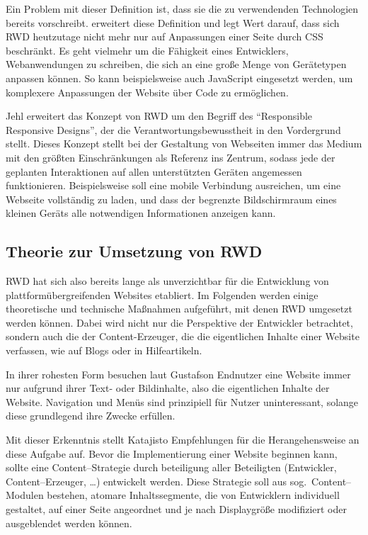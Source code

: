 Ein Problem mit dieser Definition ist, dass sie die zu verwendenden Technologien bereits vorschreibt.
\autocite[S. 28]{Laati.ImplementingResponsiveDesignInIndustrialDashboardEditor.2017} erweitert diese Definition und legt Wert darauf, dass sich \ac{RWD} heutzutage nicht mehr nur auf Anpassungen einer Seite durch \ac{CSS} beschränkt.
Es geht vielmehr um die Fähigkeit eines Entwicklers, Webanwendungen zu schreiben, die sich an eine große Menge von Gerätetypen anpassen können.
So kann beispielsweise auch JavaScript eingesetzt werden, um komplexere Anpassungen der Website über Code zu ermöglichen.

Jehl \autocite{Jehl.ResponsibleResponsiveWebDesign.2014} erweitert das Konzept von \ac{RWD} um den Begriff des "`Responsible Responsive Designs"', der die Verantwortungsbewusstheit in den Vordergrund stellt.
Dieses Konzept stellt bei der Gestaltung von Webseiten immer das Medium mit den größten Einschränkungen als Referenz ins Zentrum, sodass jede der geplanten Interaktionen auf allen unterstützten Geräten angemessen funktionieren.
Beispielsweise soll eine mobile Verbindung ausreichen, um eine Webseite vollständig zu laden, und dass der begrenzte Bildschirmraum eines kleinen Geräts alle notwendigen Informationen anzeigen kann.


\subsection{Theorie zur Umsetzung von \ac{RWD}}

\acl{RWD} hat sich also bereits lange als unverzichtbar für die Entwicklung von plattformübergreifenden Websites etabliert.
Im Folgenden werden einige theoretische und technische Maßnahmen aufgeführt, mit denen \ac{RWD} umgesetzt werden können.
Dabei wird nicht nur die Perspektive der Entwickler betrachtet, sondern auch die der Content-Erzeuger, die die eigentlichen Inhalte einer Website verfassen, wie auf Blogs oder in Hilfeartikeln.

In ihrer rohesten Form besuchen laut Gustafson \autocite[Kap. 1]{Gustafson.AdaptiveWebDesign.2011} Endnutzer eine Website immer nur aufgrund ihrer Text- oder Bildinhalte, also die eigentlichen Inhalte der Website.
Navigation und Menüs sind prinzipiell für Nutzer uninteressant, solange diese grundlegend ihre Zwecke erfüllen.

Mit dieser Erkenntnis stellt Katajisto \autocite[S. 4]{Katajisto.CreatingSupportContent.2015} Empfehlungen für die Herangehensweise an diese Aufgabe auf.
Bevor die Implementierung einer Website beginnen kann, sollte eine Content--Strategie durch beteiligung aller Beteiligten (Entwickler, Content--Erzeuger, \ldots) entwickelt werden.
Diese Strategie soll aus sog.\ Content--Modulen bestehen, atomare Inhaltssegmente, die von Entwicklern individuell gestaltet, auf einer Seite angeordnet und je nach Displaygröße modifiziert oder ausgeblendet werden können.

